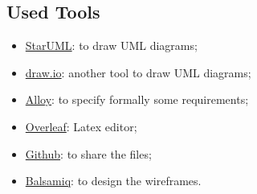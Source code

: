 \documentclass{article}
\begin{document}
\subsection{Used Tools}
\begin{itemize}
    \item \href{https://staruml.io/}{StarUML}: to draw UML diagrams;
    \item \href{https://app.diagrams.net/}{draw.io}: another tool to draw UML diagrams;
    \item \href{https://alloytools.org/}{Alloy}: to specify formally some requirements;
    \item \href{https://www.overleaf.com}{Overleaf}: Latex editor;
    \item \href{https://github.com/}{Github}: to share the files;
    \item \href{https://balsamiq.com/}{Balsamiq}: to design the wireframes.
\end{itemize}
\end{document}
